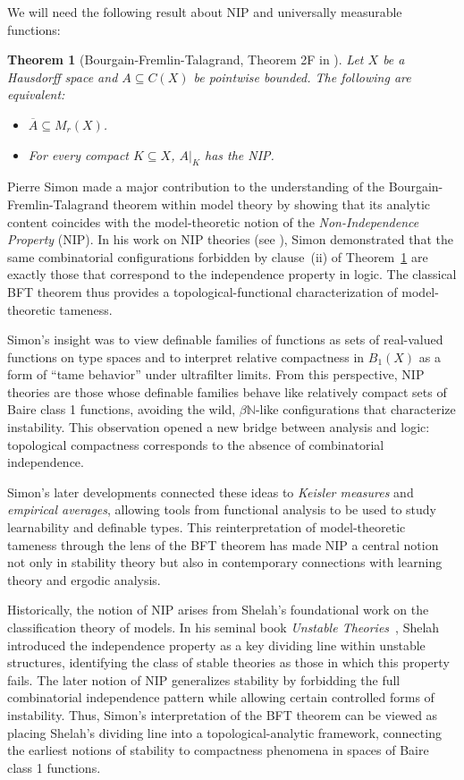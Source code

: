 \documentclass[psamsfonts]{amsart}
\newtheorem{thm}{Theorem}[section]
\theoremstyle{definition}
\theoremstyle{remark}
\numberwithin{equation}{section}
\begin{document}
We will need the following result about NIP and universally measurable functions:

\begin{thm}[Bourgain-Fremlin-Talagrand, Theorem 2F in \cite{BFT_1978_PCompactBaire}]\label{BFT}
    Let $X$ be a Hausdorff space and $A\subseteq C(X)$ be pointwise bounded. The following are equivalent:
    \begin{itemize}
        \item [(i)] $\overline{A}\subseteq M_r(X)$.
        \item [(ii)] For every compact $K\subseteq X$, $A|_K$ has the NIP.
    \end{itemize}
\end{thm}

Pierre Simon made a major contribution to the understanding of the Bourgain-Fremlin-Talagrand theorem within model theory by showing that its analytic content coincides with the model-theoretic notion of the \emph{Non-Independence Property} (NIP). In his work on NIP theories (see \cite{simon2015nip}), Simon demonstrated that the same combinatorial configurations forbidden by clause~(ii) of Theorem~\ref{BFT} are exactly those that correspond to the independence property in logic. The classical BFT theorem thus provides a topological-functional characterization of model-theoretic tameness.

Simon's insight was to view definable families of functions as sets of real-valued functions on type spaces and to interpret relative compactness in $B_1(X)$ as a form of “tame behavior” under ultrafilter limits. From this perspective, NIP theories are those whose definable families behave like relatively compact sets of Baire class 1 functions, avoiding the wild, $\beta\mathbb N$-like configurations that characterize instability. This observation opened a new bridge between analysis and logic: topological compactness corresponds to the absence of combinatorial independence.

Simon's later developments connected these ideas to \emph{Keisler measures} and \emph{empirical averages}, allowing tools from functional analysis to be used to study learnability and definable types. This reinterpretation of model-theoretic tameness through the lens of the BFT theorem has made NIP a central notion not only in stability theory but also in contemporary connections with learning theory and ergodic analysis.

Historically, the notion of NIP arises from Shelah's foundational work on the classification theory of models. In his seminal book \emph{Unstable Theories}~\cite{shelah1978unstable}, Shelah introduced the independence property as a key dividing line within unstable structures, identifying the class of stable theories as those in which this property fails. The later notion of NIP generalizes stability by forbidding the full combinatorial independence pattern while allowing certain controlled forms of instability. Thus, Simon's interpretation of the BFT theorem can be viewed as placing Shelah's dividing line into a topological-analytic framework, connecting the earliest notions of stability to compactness phenomena in spaces of Baire class 1 functions.
\end{document}
